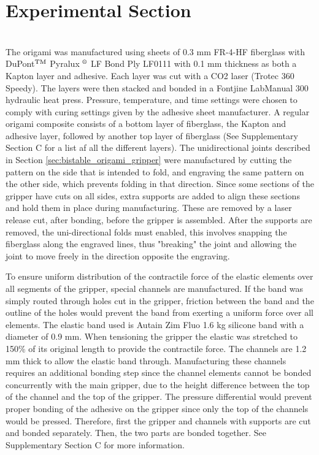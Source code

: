 \section{Experimental Section}

\\
The origami was manufactured using sheets of 0.3 mm FR-4-HF fiberglass with DuPont$\textsuperscript{TM}$ Pyralux $\textsuperscript{\textregistered}$ LF Bond Ply LF0111 with 0.1 mm thickness as both a Kapton layer and adhesive. Each layer was cut with a CO2 laser (Trotec 360 Speedy). The layers were then stacked and bonded in a Fontjine LabManual 300 hydraulic heat press. Pressure, temperature, and time settings were chosen to comply with curing settings given by the adhesive sheet manufacturer. A regular origami composite consists of a bottom layer of fiberglass, the Kapton and adhesive layer, followed by another top layer of fiberglass (See Supplementary Section C for a list af all the different layers). The unidirectional joints described in Section \ref{sec:bistable_origami_gripper} were manufactured by cutting the pattern on the side that is intended to fold, and engraving the same pattern on the other side, which prevents folding in that direction. Since some sections of the gripper have cuts on all sides, extra supports are added to align these sections and hold them in place  during manufacturing. These are removed by a laser release cut, after bonding, before the gripper is assembled. After the supports are removed, the uni-directional folds must enabled, this involves snapping the fiberglass along the engraved lines, thus "breaking" the joint and allowing the joint to move freely in the direction opposite the engraving.

To ensure uniform distribution of the contractile force of the elastic elements over all segments of the gripper, special channels are manufactured. If the band was simply routed through holes cut in the gripper, friction between the band and the outline of the holes would prevent the band from exerting a uniform force over all elements. The elastic band used is Autain Zim Fluo 1.6 kg silicone band with a diameter of 0.9 mm. When tensioning the gripper the elastic was stretched to 150\% of its original length to provide the contractile force. The channels are 1.2 mm thick to allow the elastic band through. Manufacturing these channels requires an additional bonding step since the channel elements cannot be bonded concurrently with the main gripper, due to the height difference between the top of the channel and the top of the gripper. The pressure differential would prevent proper bonding of the adhesive on the gripper since only the top of the channels would be pressed. Therefore, first the gripper and channels with supports are cut and bonded separately. Then, the two parts are bonded together. See Supplementary Section C for more information.

